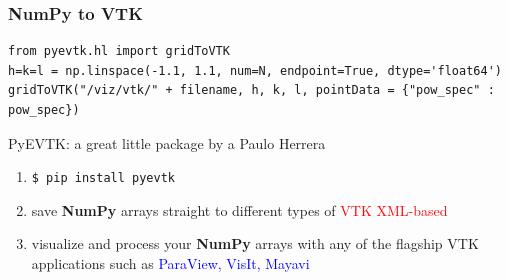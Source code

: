 \documentclass[]{beamer}
\begin{document}
\begin{frame}
\end{frame}

\begin{frame}[fragile]
\frametitle{NumPy to VTK}

\begin{lstlisting}
from pyevtk.hl import gridToVTK
h=k=l = np.linspace(-1.1, 1.1, num=N, endpoint=True, dtype='float64')
gridToVTK("/viz/vtk/" + filename, h, k, l, pointData = {"pow_spec" : pow_spec})
\end{lstlisting}
\begin{block}{PyEVTK: a great little package by a Paulo Herrera}
\begin{enumerate}
\item \small \texttt{\$ pip install pyevtk}
\item \small save \textbf{NumPy} arrays straight to different types of \textcolor{red}{VTK XML-based} 
\item \small visualize and process your \textbf{NumPy} arrays with any of the flagship VTK applications such as \textcolor{blue}{ParaView, VisIt, Mayavi}
\end{enumerate}
\end{block}
\end{frame}
\end{document}
